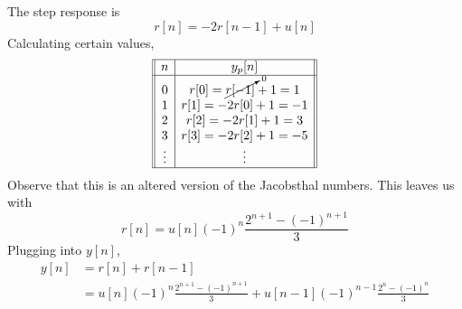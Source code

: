 \documentclass{article}
\begin{document}
The step response is
\begin{equation}
    r[n] = -2r[n - 1] + u[n]
\end{equation}
Calculating certain values,
\begin{equation}
    \begin{array}[]{||c|c||}
        \hline
        n & y_p[n] \\
        \hline
        0 & r[0] = \cancelto{0}{r[-1]} + 1 = 1 \\
        1 & r[1] = -2r[0] + 1 = -1 \\
        2 & r[2] = -2r[1] + 1 = 3 \\
        3 & r[3] = -2r[2] + 1 = -5 \\
        \vdots & \vdots \\
        \hline
    \end{array}
\end{equation}
Observe that this is an altered version of the Jacobsthal numbers.
This leaves us with
\begin{equation}
    r[n] = u[n] (-1)^n \frac{2^{n + 1} - (-1)^{n + 1}}{3}
\end{equation}
Plugging into \(y[n]\),
\begin{align}
    y[n] &= r[n] + r[n - 1] \\
    &= u[n] (-1)^n \frac{2^{n + 1} - (-1)^{n + 1}}{3} + u[n - 1] (-1)^{n - 1} \frac{2^n - (-1)^n}{3}
\end{align}
\end{document}
